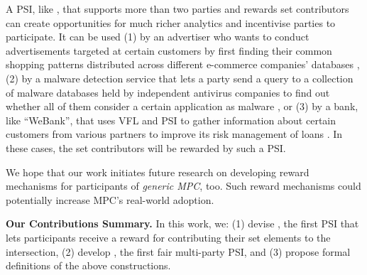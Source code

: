 A PSI, like \withRew, that supports more than two parties and rewards set contributors can create opportunities for much richer analytics and incentivise parties to participate. It can be used (1) by an advertiser who wants to conduct advertisements targeted at certain customers by first finding their common shopping patterns distributed across different e-commerce companies' databases \cite{IonKNPSS0SY20}, (2) by a malware detection service that lets a party send a query to a collection of malware databases held by independent antivirus companies to find out whether all of them consider a certain application as malware \cite{TamrakarLPEPA17}, or (3) by a bank, like ``WeBank'', that uses VFL and PSI to gather information about certain customers from various partners to improve its risk management of loans \cite{ChengLCY20}. In these cases, the set contributors will be rewarded by such a PSI. 



We hope that our work initiates future research on developing reward mechanisms for participants of \emph{generic MPC}, too. Such reward mechanisms could potentially increase MPC's real-world adoption.  

\vspace{-4mm}
\begin{paragraph}
%
{\textbf{Our Contributions Summary.}} In this work, we: (1) devise \withRew, the first PSI that lets participants receive a reward for contributing their set elements to the intersection, (2) develop \withFai, the first fair multi-party PSI, and (3) propose formal definitions of the above constructions.
%
\end{paragraph}










%












%













